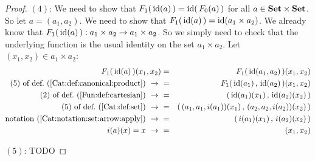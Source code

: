 \begin{proof}
    $(4)$: We need to show that $F_{1}(\,\mbox{\rm id}(a)\,)=\mbox{\rm id}(\,F_{0}(a)\,)$ for all 
    $a\in\mbox{\bf Set}\times\mbox{\bf Set}$. So let $a=(a_{1},a_{2})$. We need to show that
    $F_{1}(\,\mbox{\rm id}(a)\,)=\mbox{\rm id}(a_{1}\times a_{2})$. We already know that
    $F_{1}(\,\mbox{\rm id}(a)\,):a_{1}\times a_{2}\to a_{1}\times a_{2}$. So we simply
    need to check that the underlying function is the usual identity on the
    set $a_{1}\times a_{2}$. Let $(x_{1},x_{2})\in a_{1}\times a_{2}$:
        \begin{eqnarray*}F_{1}(\,\id(a)\,)(x_{1},x_{2})
            &=&F_{1}(\,\id(a_{1},a_{2})\,)(x_{1},x_{2})\\
            \mbox{$(5)$ of def.~(\ref{Cat:def:canonical:product})}\ \to\ 
            &=&F_{1}(\,\id(a_{1})\,,\,\id(a_{2})\,)(x_{1},x_{2})\\
            \mbox{$(2)$ of def.~(\ref{Fun:def:cartesian})}\ \to\ 
            &=&(\,\id(a_{1})(x_{1})\,,\,\id(a_{2})(x_{2})\,)\\
            \mbox{$(5)$ of def.~(\ref{Cat:def:set})}\ \to\ 
            &=&(\,(a_{1},a_{1},i(a_{1}))(x_{1})\,
               ,\,(a_{2},a_{2},i(a_{2}))(x_{2})\,)\\
            \mbox{notation~(\ref{Cat:notation:set:arrow:apply})}\ \to\ 
            &=&(\,i(a_{1})(x_{1})\,,\,i(a_{2})(x_{2})\,)\\
            i(a)(x)=x\ \to\ 
            &=&(x_{1},x_{2})
        \end{eqnarray*}

    $(5)$: TODO
\end{proof}

